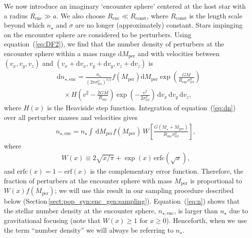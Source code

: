 \documentclass[iop,usenatbib]{emulateapj}
\renewcommand{\S}{Section}
\newcommand{\renc}{R_\mathrm{enc}}
\newcommand{\mper}{M_\mathrm{per}}
\newcommand{\srel}{\sigma_\mathrm{rel}}
\begin{document}
We now introduce an imaginary `encounter sphere' centered at the host star with a radius $\renc \gg a$. We also choose $\renc \ll R_\mathrm{const}$, where $R_\mathrm{const}$ is the length scale beyond which $n_\star$ and $\sigma$ are no longer (approximately) constant. Stars impinging on the encounter sphere are considered to be perturbers. Using equation~(\ref{eq:DF2}), we find that the number density of perturbers at the encounter sphere within a mass range $\mathrm{d} \mper$ and with velocities between $(v_x,v_y,v_z)$ and $(v_x+\mathrm{d}v_x,v_y+\mathrm{d}v_y,v_z+\mathrm{d}v_z)$ is 
\begin{align}
\label{eq:dn}
\nonumber &\mathrm{d} {n_{\star,\mathrm{enc}}} = \frac{ n_\star}{(2\pi \srel^2 )^{3/2}} f(\mper) \mathrm{d} \mper \exp \left ( \frac{GM}{\renc \srel^2} \right ) \\
&\quad \times H\left(v^2-\frac{2GM}{\renc} \right ) \exp \left ( -\frac{v^2}{2 \srel^2} \right ) \, \mathrm{d} v_x \, \mathrm{d} v_y \, \mathrm{d} v_z,
\end{align}
where $H(x)$ is the Heaviside step function. Integration of equation~(\ref{eq:dn}) over all perturber masses and velocities gives
\begin{align}
\label{eq:n}
n_{\star,\mathrm{enc}} = n_\star \int \, \mathrm{d} \mper f(\mper) \, W \left [ \frac{G(M_\star + \mper)}{\renc \srel^2} \right ],
\end{align}
where
\begin{align}
\label{eq:W}
W(x) \equiv 2\sqrt{x/\pi} + \exp(x) \, \mathrm{erfc}(\sqrt{x}),
\end{align}
and $\mathrm{erfc}(x) = 1 - \mathrm{erf}(x)$ is the complementary error function. Therefore, the fraction of perturbers at the encounter sphere with mass $\mper$ is proportional to $W(x)f(\mper)$; we will use this result in our sampling procedure described below (\S\,\ref{sect:pop_syn:enc_gen:sampling}). Equation~(\ref{eq:n}) shows that the stellar number density at the encounter sphere, $n_{\star,\mathrm{enc}}$, is larger than $n_\star$ due to gravitational focusing (note that $W(x) \geq 1$ for $x \geq 0$). Henceforth,  when we use the term ``number density'' we will always be referring to $n_\star$.
\end{document}

